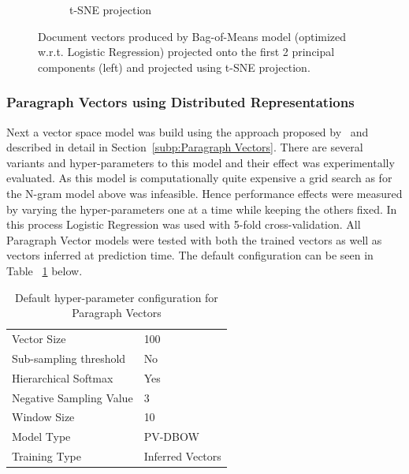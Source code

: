 \begin{figure}[h!]
\begin{subfigure}[b]{0.48\textwidth}
      \caption{t-SNE projection}
\label{fig:bom-tsne}
    \end{subfigure}
    \caption{Document vectors produced by Bag-of-Means model (optimized w.r.t. Logistic Regression) projected onto the first 2 principal components (left) and projected using t-SNE projection. }
\label{fig:bom}
\end{figure}

\subsubsection{Paragraph Vectors using Distributed Representations}
\label{subs:Paragraph Vectors using Distributed Representations}


Next a vector space model was build using the approach proposed by~\cite{Le:2014aa} and described in detail in Section~\ref{subp:Paragraph Vectors}. There are several variants and hyper-parameters to this model and their effect was experimentally evaluated. As this model is computationally quite expensive a grid search as for the N-gram model above was infeasible. Hence performance effects were measured by varying the hyper-parameters one at a time while keeping the others fixed. In this process Logistic Regression was used with 5-fold cross-validation. All Paragraph Vector models were tested with both the trained vectors as well as vectors inferred at prediction time. The default configuration can be seen in Table ~\ref{tab:Paragraph Vector Defaults} below.

\begin{table}[h]
  \begin{center}
  \begin{tabular}{ l | l }
    \toprule
    Vector Size & 100 \\
    Sub-sampling threshold & No \\
    Hierarchical Softmax & Yes \\
    Negative Sampling Value & 3 \\
    Window Size & 10 \\
    Model Type & PV-DBOW \\
    Training Type & Inferred Vectors \\
    \bottomrule
  \end{tabular}
  \caption{Default hyper-parameter configuration for Paragraph Vectors}
  \label{tab:Paragraph Vector Defaults}
\end{center}
\end{table}


